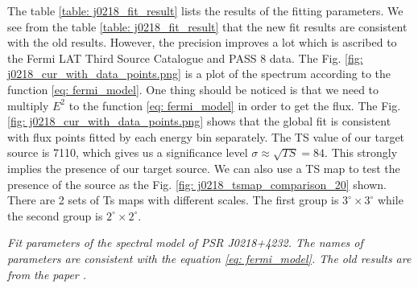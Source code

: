 \documentclass[12pt]{report}
\newcommand{\mycaption}[1]{\caption{\textit{\footnotesize #1}}}
\begin{document}
            The table \ref{table: j0218_fit_result} lists the results of the fitting parameters. 
            We see from the table \ref{table: j0218_fit_result} that the new fit results are consistent 
            with the old results. However, the precision improves a lot which is ascribed to the 
            Fermi LAT Third Source Catalogue and PASS 8 data. The Fig.
            \ref{fig: j0218_cur_with_data_points.png} is a plot of the spectrum according to 
            the function \ref{eq: fermi_model}.
            One thing should be noticed is that we need to multiply $E^2$ to the function \ref{eq: fermi_model} 
            in order to get the flux. The Fig.\ref{fig: j0218_cur_with_data_points.png} shows that the global 
            fit is consistent with flux points fitted by each energy bin separately. 
            The TS value of our target source is 7110, which gives us 
            a significance level $\sigma \approx \sqrt{TS} = 84$. This strongly implies the presence of our
            target source. We can also use a TS map to test the presence of the source as the Fig.
            \ref{fig: j0218_tsmap_comparison_20} shown. 
            There are 2 sets of Ts maps with different scales. The first group is $3^{\circ} 
            \times3^{\circ}$ while the second group is $2^{\circ} \times2^{\circ}$. 
            \vspace{1cm}
            \begin{table}[!ht]
              \centering
                \mycaption{Fit parameters of the spectral model of PSR J0218+4232. 
                  The names of parameters are consistent with the equation
                  \ref{eq: fermi_model}. The old results are from the paper \cite{0067-0049-208-2-17}.}
                \label{table: j0218_fit_result}        
            \end{table}  
\end{document}

